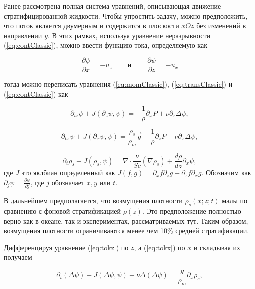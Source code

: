 Ранее рассмотрена полная система уравнений, описывающая движение стратифицированной жидкости. Чтобы упростить задачу, можно предположить, что поток является двумерным и содержится в плоскости $xOz$ без изменений в направлении $y$. В этих рамках, используя уравнение неразрывности (\ref{eq:contClassic}), можно ввести функцию тока, определяемую как

\begin{equation}
    \frac{\partial \psi}{\partial x} = - u_z \;\;\;\;\;\;\;\; и \;\;\;\;\;\;\;\; \frac{\partial \psi}{\partial z} = - u_x
\end{equation}

тогда можно переписать уравнения (\ref{eq:momClassic}), (\ref{eq:transClassic}) и (\ref{eq:contClassic}) как

\begin{equation}
    \partial_{tz} \psi + J(\partial_z \psi, \psi) = - \frac{1}{\rho} \partial_x P + \nu \partial_z \Delta \psi,
    \label{eq:tokz}
\end{equation}

\begin{equation}
    \partial_{tx} \psi + J(\partial_x \psi, \psi) = \frac{\rho_s}{\rho_m}\vec{g}+\frac{1}{\rho}\partial_z P + \nu \partial_x \Delta \psi,
    \label{eq:tokx}
\end{equation}

\begin{equation}
    \partial_t \rho_s + J(\rho_s,\psi) = \nabla \cdot \frac{\nu}{Sc} (\nabla \rho_s) + \frac{d \rho}{dz} \partial_x \psi,
\end{equation}
где $J$ это яклбиан определенный как $J(f,g) = \partial_x f \partial_z g - \partial_z f \partial_x g.$ Обозначим как $\partial_j \psi =\frac{\partial \psi}{\partial j}$, где $j$ обозначает $x,y$ или $t$. 

В дальнейшем предполагается, что возмущения плотности $\rho_s(x; z; t)$ малы по сравнению с фоновой стратификацией $\rho(z)$. Это предположение полностью верно как в океане, так и экспериментах, рассматриваемых тут. Таким образом, возмущения плотности ограничиваются менее чем 10\% средней стратификации. 

Дифференцируя уравнение (\ref{eq:tokz}) по $z$, а (\ref{eq:tokx}) по $x$ и складывая их получаем

\begin{equation}
    \partial_t(\Delta \psi) + J (\Delta \psi, \psi) - \nu \Delta (\Delta \psi) = \frac{g}{\rho_m} \partial_x \rho_s,
    \label{eq:tokzz}
\end{equation}

